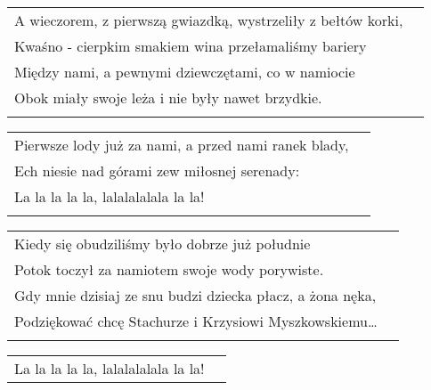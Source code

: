 \documentclass[a5paper]{article}
\begin{document}
\noindent
\begin{tabular}{@{}p{10.30cm}p{3cm}@{}}
A wieczorem, z pierwszą gwiazdką, wystrzeliły z bełtów korki, \\
Kwaśno - cierpkim smakiem wina przełamaliśmy bariery \\
Między nami, a pewnymi dziewczętami, co w namiocie \\
Obok miały swoje leża i nie były nawet brzydkie. \\ \\
\end{tabular}

\noindent
\begin{tabular}{@{}p{10.30cm}p{3cm}@{}}
Pierwsze lody już za nami, a przed nami ranek blady, \\
Ech niesie nad górami zew miłosnej serenady: \\
La la la la la, lalalalalala la la! \\ \\
\end{tabular}

\noindent
\begin{tabular}{@{}p{10.30cm}p{3cm}@{}}
Kiedy się obudziliśmy było dobrze już południe \\
Potok toczył za namiotem swoje wody porywiste. \\
Gdy mnie dzisiaj ze snu budzi dziecka płacz, a żona nęka, \\
Podziękować chcę Stachurze i Krzysiowi Myszkowskiemu… \\ \\
\end{tabular}

\noindent
\begin{tabular}{@{}p{8.30cm}p{3cm}@{}}
La la la la la, lalalalalala la la!
\end{tabular}
\end{document}
